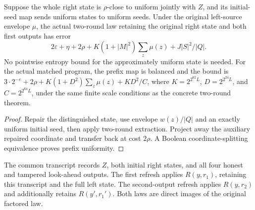 \begin{theorem}
  \label{thm:lowerbounds-algebraic-lookahead-uniform-state}
  \leanok
  Suppose the whole right state is $\rho$-close to uniform jointly with
  $Z$, and its initial-seed map sends uniform states to uniform seeds.
  Under the original left-source envelope $\mu$, the actual two-round law
  retaining the original right state and both first outputs has error
  \[
    2\varepsilon+\eta+2\rho+
    K(1+|M|^2)\sum_z\mu(z)+J|S|^2/|Q|.
  \]
  No pointwise entropy bound for the approximately uniform state is needed.
  For the actual matched program, the prefix map is balanced and the bound
  is $3\cdot2^{-e}+2\rho+K(1+D^2)\sum_z\mu(z)+KD^2/C$, where
  $K=2^{2^{62}L}$, $D=2^{2^{24}L}$, and $C=2^{2^{64}L}$, under the
  same finite scale conditions as the concrete two-round theorem.
\end{theorem}
\begin{proof}
  \leanok
  Repair the distinguished state, use envelope $w(z)/|Q|$ and an exactly
  uniform initial seed, then apply two-round extraction. Project away the
  auxiliary repaired coordinate and transfer back at cost $2\rho$.
  A Boolean coordinate-splitting equivalence proves prefix uniformity.
\end{proof}

\begin{definition}
  \label{def:lowerbounds-algebraic-lookahead-refresh}
  \leanok
  The common transcript records $Z$, both initial right states, and all
  four honest and tampered look-ahead outputs. The first refresh applies
  $R(y,r_1)$, retaining this transcript and the full left state.
  The second-output refresh applies $R(y,r_2)$ and additionally retains
  $R(y',r_1')$. Both laws are direct images of the original factored law.
\end{definition}

